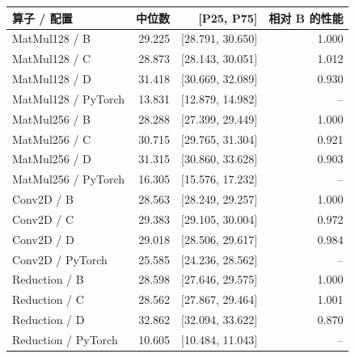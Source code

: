 \begin{tabular*}{0.92\textwidth}{@{\extracolsep{\fill}}lrrr@{}}
\toprule
算子 / 配置 & 中位数 & [P25, P75] & 相对 B 的性能 \\
\midrule
MatMul128 / B & 29.225 & [28.791, 30.650] & 1.000 \\
MatMul128 / C & 28.873 & [28.143, 30.051] & 1.012 \\
MatMul128 / D & 31.418 & [30.669, 32.089] & 0.930 \\
MatMul128 / PyTorch & 13.831 & [12.879, 14.982] & -- \\
\midrule
MatMul256 / B & 28.288 & [27.399, 29.449] & 1.000 \\
MatMul256 / C & 30.715 & [29.765, 31.304] & 0.921 \\
MatMul256 / D & 31.315 & [30.860, 33.628] & 0.903 \\
MatMul256 / PyTorch & 16.305 & [15.576, 17.232] & -- \\
\midrule
Conv2D / B & 28.563 & [28.249, 29.257] & 1.000 \\
Conv2D / C & 29.383 & [29.105, 30.004] & 0.972 \\
Conv2D / D & 29.018 & [28.506, 29.617] & 0.984 \\
Conv2D / PyTorch & 25.585 & [24.236, 28.562] & -- \\
\midrule
Reduction / B & 28.598 & [27.646, 29.575] & 1.000 \\
Reduction / C & 28.562 & [27.867, 29.464] & 1.001 \\
Reduction / D & 32.862 & [32.094, 33.622] & 0.870 \\
Reduction / PyTorch & 10.605 & [10.484, 11.043] & -- \\
\bottomrule
\end{tabular*}
